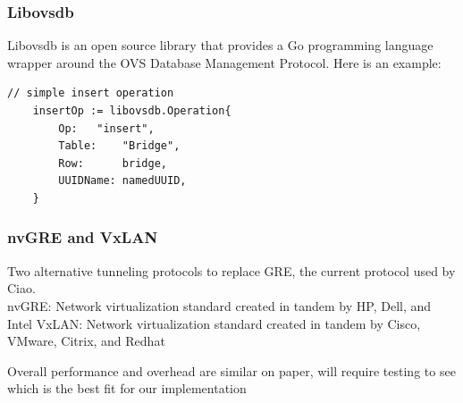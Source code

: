 \documentclass[pdf]{beamer}
\begin{document}
\begin{frame}[fragile]
	\frametitle{Libovsdb}
	Libovsdb is an open source library that provides a Go programming
	language wrapper around the OVS Database Management Protocol. Here is
	an example:\cite{gosample} \\

\begin{lstlisting}[caption=Example insert operation using libovsdb]
	// simple insert operation
	insertOp := libovsdb.Operation{
	    Op:	  "insert",
	    Table:	  "Bridge",
	    Row:	  bridge,
	    UUIDName: namedUUID,
	}

\end{lstlisting}
\end{frame}
\begin{frame}
	\frametitle{nvGRE and VxLAN}
	Two alternative tunneling protocols to replace GRE, the current
	protocol used by Ciao.\\
	nvGRE: Network virtualization standard created in tandem by HP, Dell,
	and Intel
	VxLAN: Network virtualization standard created in tandem by Cisco,
	VMware, Citrix, and Redhat

	Overall performance and overhead are similar on paper, will require
	testing to see which is the best fit for our implementation
\end{frame}
\end{document}
